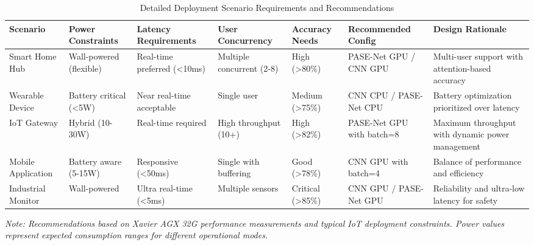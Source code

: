 \begin{table*}[t]
\centering
\caption{Detailed Deployment Scenario Requirements and Recommendations}
\label{tab:deployment_scenarios}
\footnotesize
\begin{tabular}{@{}p{2.5cm}p{2cm}p{1.8cm}p{1.8cm}p{1.5cm}p{2.5cm}p{3cm}@{}}
\toprule
\textbf{Scenario} & \textbf{Power Constraints} & \textbf{Latency Requirements} & \textbf{User Concurrency} & \textbf{Accuracy Needs} & \textbf{Recommended Config} & \textbf{Design Rationale} \\
\midrule
Smart Home Hub & Wall-powered (flexible) & Real-time preferred (<10ms) & Multiple concurrent (2-8) & High (>80\%) & PASE-Net GPU / CNN GPU & Multi-user support with attention-based accuracy \\
Wearable Device & Battery critical (<5W) & Near real-time acceptable & Single user & Medium (>75\%) & CNN CPU / PASE-Net CPU & Battery optimization prioritized over latency \\
IoT Gateway & Hybrid (10-30W) & Real-time required & High throughput (10+) & High (>82\%) & PASE-Net GPU with batch=8 & Maximum throughput with dynamic power management \\
Mobile Application & Battery aware (5-15W) & Responsive (<50ms) & Single with buffering & Good (>78\%) & CNN GPU with batch=4 & Balance of performance and efficiency \\
Industrial Monitor & Wall-powered & Ultra real-time (<5ms) & Multiple sensors & Critical (>85\%) & CNN GPU / PASE-Net GPU & Reliability and ultra-low latency for safety \\
\bottomrule
\end{tabular}
\end{table*}
\textit{Note: Recommendations based on Xavier AGX 32G performance measurements and typical IoT deployment constraints. Power values represent expected consumption ranges for different operational modes.}